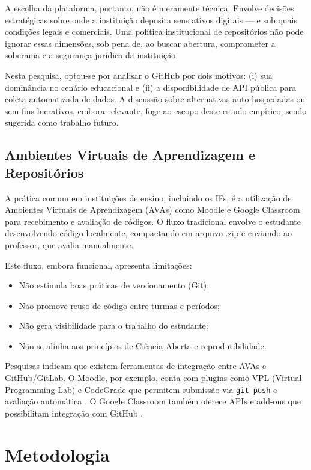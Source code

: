 \documentclass[english, spanish, brazilian]{RBIEarticle}
\begin{document}
A escolha da plataforma, portanto, não é meramente técnica. Envolve decisões estratégicas sobre onde a instituição deposita seus ativos digitais — e sob quais condições legais e comerciais. Uma política institucional de repositórios não pode ignorar essas dimensões, sob pena de, ao buscar abertura, comprometer a soberania e a segurança jurídica da instituição.

Nesta pesquisa, optou-se por analisar o GitHub por dois motivos: (i) sua dominância no cenário educacional e (ii) a disponibilidade de API pública para coleta automatizada de dados. A discussão sobre alternativas auto-hospedadas ou sem fins lucrativos, embora relevante, foge ao escopo deste estudo empírico, sendo sugerida como trabalho futuro.

\subsection{Ambientes Virtuais de Aprendizagem e Repositórios}

A prática comum em instituições de ensino, incluindo os IFs, é a utilização de Ambientes Virtuais de Aprendizagem (AVAs) como Moodle e Google Classroom para recebimento e avaliação de códigos. O fluxo tradicional envolve o estudante desenvolvendo código localmente, compactando em arquivo .zip e enviando ao professor, que avalia manualmente.

Este fluxo, embora funcional, apresenta limitações:
\begin{itemize}
\item Não estimula boas práticas de versionamento (Git);
\item Não promove reuso de código entre turmas e períodos;
\item Não gera visibilidade para o trabalho do estudante;
\item Não se alinha aos princípios de Ciência Aberta e reprodutibilidade.
\end{itemize}

Pesquisas indicam que existem ferramentas de integração entre AVAs e GitHub/GitLab. O Moodle, por exemplo, conta com plugins como VPL (Virtual Programming Lab) e CodeGrade que permitem submissão via \texttt{git push} e avaliação automática \cite{moodle2024}. O Google Classroom também oferece APIs e add-ons que possibilitam integração com GitHub \cite{google2024}.


\section{Metodologia}
\end{document}
